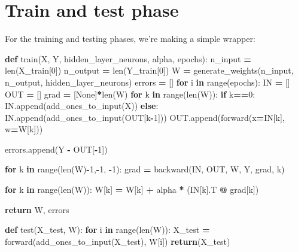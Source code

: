 \documentclass[
]{book}
\newenvironment{Shaded}{\begin{snugshade}}{\end{snugshade}}
\newcommand{\BuiltInTok}[1]{#1}
\newcommand{\ControlFlowTok}[1]{\textcolor[rgb]{0.13,0.29,0.53}{\textbf{#1}}}
\newcommand{\DecValTok}[1]{\textcolor[rgb]{0.00,0.00,0.81}{#1}}
\newcommand{\KeywordTok}[1]{\textcolor[rgb]{0.13,0.29,0.53}{\textbf{#1}}}
\newcommand{\NormalTok}[1]{#1}
\newcommand{\OperatorTok}[1]{\textcolor[rgb]{0.81,0.36,0.00}{\textbf{#1}}}
\newcommand{\VariableTok}[1]{\textcolor[rgb]{0.00,0.00,0.00}{#1}}
\begin{document}
\hypertarget{train-and-test-phase}{%
\section{Train and test phase}\label{train-and-test-phase}}

For the training and testing phases, we're making a simple wrapper:

\begin{Shaded}
\begin{Highlighting}[]
\KeywordTok{def}\NormalTok{ train(X, Y, hidden\_layer\_neurons, alpha, epochs):}
\NormalTok{  n\_input }\OperatorTok{=} \BuiltInTok{len}\NormalTok{(X\_train[}\DecValTok{0}\NormalTok{])}
\NormalTok{  n\_output }\OperatorTok{=} \BuiltInTok{len}\NormalTok{(Y\_train[}\DecValTok{0}\NormalTok{])}
\NormalTok{  W }\OperatorTok{=}\NormalTok{ generate\_weights(n\_input, n\_output, hidden\_layer\_neurons)}
\NormalTok{  errors }\OperatorTok{=}\NormalTok{ []}
  \ControlFlowTok{for}\NormalTok{ i }\KeywordTok{in} \BuiltInTok{range}\NormalTok{(epochs):}
\NormalTok{    IN }\OperatorTok{=}\NormalTok{ []}
\NormalTok{    OUT }\OperatorTok{=}\NormalTok{ []}
\NormalTok{    grad }\OperatorTok{=}\NormalTok{ [}\VariableTok{None}\NormalTok{]}\OperatorTok{*}\BuiltInTok{len}\NormalTok{(W)}
    \ControlFlowTok{for}\NormalTok{ k }\KeywordTok{in} \BuiltInTok{range}\NormalTok{(}\BuiltInTok{len}\NormalTok{(W)):}
      \ControlFlowTok{if}\NormalTok{ k}\OperatorTok{==}\DecValTok{0}\NormalTok{:}
\NormalTok{        IN.append(add\_ones\_to\_input(X))}
      \ControlFlowTok{else}\NormalTok{:}
\NormalTok{        IN.append(add\_ones\_to\_input(OUT[k}\OperatorTok{{-}}\DecValTok{1}\NormalTok{]))}
\NormalTok{      OUT.append(forward(x}\OperatorTok{=}\NormalTok{IN[k], w}\OperatorTok{=}\NormalTok{W[k]))}
      
\NormalTok{    errors.append(Y }\OperatorTok{{-}}\NormalTok{ OUT[}\OperatorTok{{-}}\DecValTok{1}\NormalTok{])}
      
    \ControlFlowTok{for}\NormalTok{ k }\KeywordTok{in} \BuiltInTok{range}\NormalTok{(}\BuiltInTok{len}\NormalTok{(W)}\OperatorTok{{-}}\DecValTok{1}\NormalTok{,}\OperatorTok{{-}}\DecValTok{1}\NormalTok{, }\OperatorTok{{-}}\DecValTok{1}\NormalTok{):}
\NormalTok{      grad }\OperatorTok{=}\NormalTok{ backward(IN, OUT, W, Y, grad, k) }
      
    \ControlFlowTok{for}\NormalTok{ k }\KeywordTok{in} \BuiltInTok{range}\NormalTok{(}\BuiltInTok{len}\NormalTok{(W)):}
\NormalTok{      W[k] }\OperatorTok{=}\NormalTok{ W[k] }\OperatorTok{+}\NormalTok{ alpha }\OperatorTok{*}\NormalTok{ (IN[k].T }\OperatorTok{@}\NormalTok{ grad[k])}
      
  \ControlFlowTok{return}\NormalTok{ W, errors}

\KeywordTok{def}\NormalTok{ test(X\_test, W):}
  \ControlFlowTok{for}\NormalTok{ i }\KeywordTok{in} \BuiltInTok{range}\NormalTok{(}\BuiltInTok{len}\NormalTok{(W)):}
\NormalTok{    X\_test }\OperatorTok{=}\NormalTok{ forward(add\_ones\_to\_input(X\_test), W[i])}
  \ControlFlowTok{return}\NormalTok{(X\_test)}
\end{Highlighting}
\end{Shaded}
\end{document}
